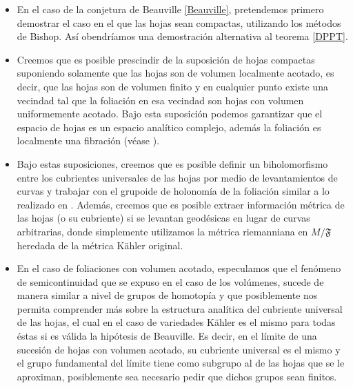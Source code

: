 \documentclass{article}
\begin{document}
\begin{itemize}
        \item En el caso de la conjetura de Beauville \ref{Beauville}, pretendemos primero demostrar el caso en el que 
        las hojas sean compactas, utilizando los m\'etodos de Bishop. As\'i obendr\'iamos una demostraci\'on alternativa al
        teorema \ref{DPPT}.

        \item  Creemos que es posible prescindir de la suposici\'on de hojas compactas suponiendo solamente que las 
        hojas son de volumen localmente acotado, es decir, que las hojas son de volumen finito y en cualquier punto existe
        una vecindad tal que la foliaci\'on en esa vecindad son hojas con volumen uniformemente acotado. Bajo esta 
        suposici\'on podemos garantizar que el espacio de hojas es un espacio anal\'itico complejo, adem\'as la foliaci\'on es 
        localmente una fibraci\'on (v\'ease \cite{A-V}). 
        
        \item Bajo estas suposiciones, creemos que es posible definir un biholomorfismo entre los cubrientes universales 
        de las hojas por medio de levantamientos de curvas y trabajar con el grupoide de holonom\'ia de la foliaci\'on
        similar a lo realizado en \cite{DPPT}. Adem\'as, creemos que es posible extraer informaci\'on m\'etrica de las
        hojas (o su cubriente) si se levantan geod\'esicas en lugar de curvas arbitrarias, donde simplemente utilizamos la 
        m\'etrica riemanniana en $M/\mathfrak{F}$ heredada de la m\'etrica K\"ahler original. 
        
        \item En el caso de foliaciones con volumen acotado, especulamos que el fen\'omeno de semicontinuidad que se expuso en el caso
        de los vol\'umenes, sucede de manera similar a nivel de grupos de homotop\'ia y que posiblemente nos permita comprender m\'as sobre la estructura 
        anal\'itica del cubriente universal de las hojas, el cual en el caso de variedades K\"ahler es el mismo para todas \'estas
        si es v\'alida la hip\'otesis de Beauville. Es decir, en el l\'imite de una sucesi\'on de hojas con volumen acotado, su cubriente
        universal es el mismo y el grupo fundamental del l\'imite tiene como subgrupo al de las hojas que se le aproximan,
        posiblemente sea necesario pedir que dichos grupos sean finitos.


\end{itemize}
\end{document}
